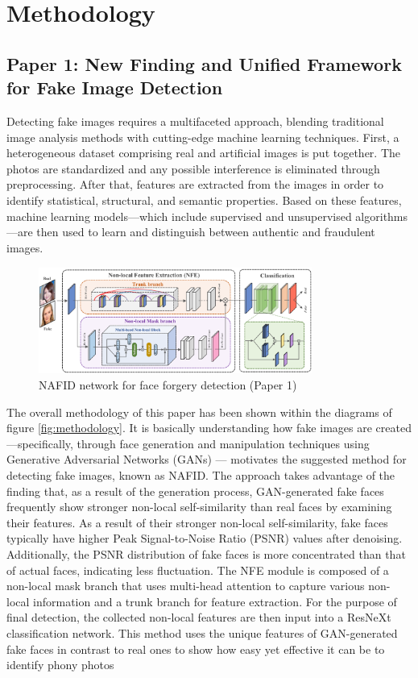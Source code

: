 \documentclass[a4paper,14pt]{report}
\begin{document}
\chapter{Methodology}
\section{Paper 1: New Finding and Unified Framework for Fake Image Detection}
Detecting fake images requires a multifaceted approach, blending traditional image analysis methods with cutting-edge machine learning techniques. First, a heterogeneous dataset comprising real and artificial images is put together. The photos are standardized and any possible interference is eliminated through preprocessing. After that, features are extracted from the images in order to identify statistical, structural, and semantic properties. Based on these features, machine learning models—which include supervised and unsupervised algorithms—are then used to learn and distinguish between authentic and fraudulent images. 
\begin{figure}[H]
    \centering
    \includegraphics[width=0.8\textwidth]{Images/method_paper1.png}
    \caption{NAFID network for face forgery detection (Paper 1)}
    \label{fig:rainy_clean}
\end{figure}
The overall methodology of this paper has been shown within the diagrams of figure \ref{fig:methodology}.
It is basically understanding how fake images are created—specifically, through face generation and manipulation techniques using Generative Adversarial Networks (GANs) \cite{10} \cite{18} — motivates the suggested method for detecting fake images, known as NAFID. The approach takes advantage of the finding that, as a result of the generation process, GAN-generated fake faces frequently show stronger non-local self-similarity than real faces by examining their features. As a result of their stronger non-local self-similarity, fake faces typically have higher Peak Signal-to-Noise Ratio (PSNR) values after denoising. Additionally, the PSNR distribution of fake faces is more concentrated than that of actual faces, indicating less fluctuation. The NFE module is composed of a non-local mask branch that uses multi-head attention to capture various non-local information and a trunk branch for feature extraction. For the purpose of final detection, the collected non-local features are then input into a ResNeXt classification network. This method uses the unique features of GAN-generated \cite{10} \cite{18} fake faces in contrast to real ones to show how easy yet effective it can be to identify phony photos
\end{document}
